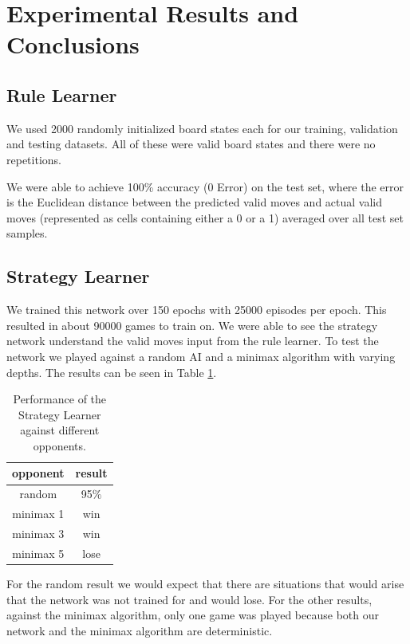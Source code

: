 \section{Experimental Results and Conclusions}

\subsection{Rule Learner}
We used 2000 randomly initialized board states each for our training, validation and testing datasets. All of these were valid board states and there were no repetitions.

We were able to achieve 100\% accuracy (0 Error) on the test set, where the error is the Euclidean distance between the predicted valid moves and actual valid moves (represented as cells containing either a 0 or a 1) averaged over all test set samples.

\subsection{Strategy Learner}
We trained this network over 150 epochs with 25000 episodes per epoch. This resulted in about 90000 games to train on. We were able to see the strategy network understand the valid moves input from the rule learner. To test the network we played against a random AI and a minimax algorithm with varying depths. The results can be seen in Table \ref{table}. 

\begin{table}[h!]
  \begin{center}
    \begin{tabular}{c||c}
    	opponent & result\\
    	\hline
    	\hline
      	random & 95$\%$\\
      	\hline
      	minimax 1 & win\\
      	\hline 
      	minimax 3 & win\\
      	\hline 
      	minimax 5 & lose\\
    \end{tabular}
  \end{center}
  \caption{Performance of the Strategy Learner against different opponents.}
  \label{table}
\end{table}

For the random result we would expect that there are situations that would arise that the network was not trained for and would lose. For the other results, against the minimax algorithm, only one game was played because both our network and the minimax algorithm are deterministic. 

